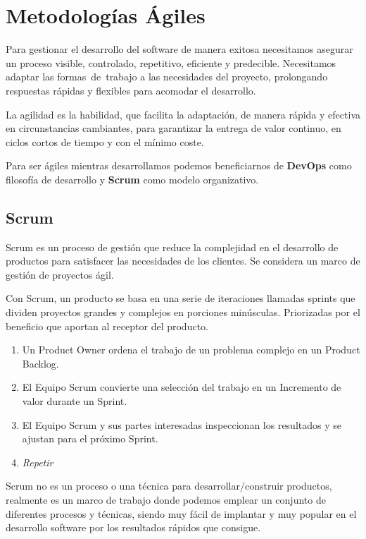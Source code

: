 \documentclass[12pt,twoside,titlepage]{report}
\begin{document}
\chapter{Metodologías Ágiles}

Para gestionar el desarrollo del software de manera exitosa necesitamos asegurar un proceso visible, controlado, repetitivo, eficiente y predecible. Necesitamos adaptar las formas de trabajo a las necesidades del proyecto, prolongando respuestas rápidas y flexibles para acomodar el desarrollo.

La agilidad es la habilidad, que facilita la adaptación, de manera rápida y efectiva en circunstancias cambiantes, para garantizar la entrega de valor continuo, en ciclos cortos de tiempo y con el mínimo coste.

Para ser ágiles mientras desarrollamos podemos beneficiarnos de \textbf{DevOps} como filosofía de desarrollo y \textbf{Scrum} como modelo organizativo.

\section{Scrum}

Scrum es un proceso de gestión que reduce la complejidad en el desarrollo de productos para satisfacer las necesidades de los clientes. Se considera un marco de gestión de proyectos ágil.

Con Scrum, un producto se basa en una serie de iteraciones llamadas sprints que dividen proyectos grandes y complejos en porciones minúsculas. Priorizadas por el beneficio que aportan al receptor del producto.

\begin{enumerate}
    \item Un Product Owner ordena el trabajo de un problema complejo en un Product Backlog.
    \item El Equipo Scrum convierte una selección del trabajo en un Incremento de valor durante un Sprint.
    \item El Equipo Scrum y sus partes interesadas inspeccionan los resultados y se ajustan para el próximo Sprint.
    \item \textit{Repetir}
\end{enumerate}

Scrum no es un proceso o una técnica para desarrollar/construir productos, realmente es un marco de trabajo donde podemos emplear un conjunto de diferentes procesos y técnicas, siendo muy fácil de implantar y muy popular en el desarrollo software por los resultados rápidos que consigue.
\end{document}

